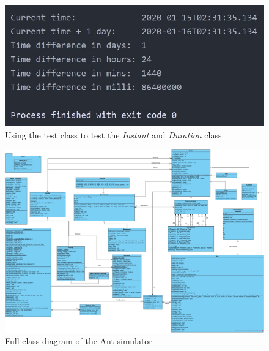 \documentclass[a4paper, oneside, 11pt]{report}
\begin{document}
\begin{figure}[htb]
	\begin{center}
		\includegraphics[width=0.6 \columnwidth]{Test_Class.jpg}
		\caption{Using the test class to test the \textit{Instant} and \textit{Duration} class}
		\label{fig:Test_Class}
	\end{center}
\end{figure}


\begin{figure}
	\begin{center}
		\includegraphics[width=1.0 \columnwidth]{Full_Class_Diagram.jpg}
		\caption{Full class diagram of the Ant simulator}
		\label{fig:Full_Class_Diagram}
	\end{center}
\end{figure}
\end{document}

